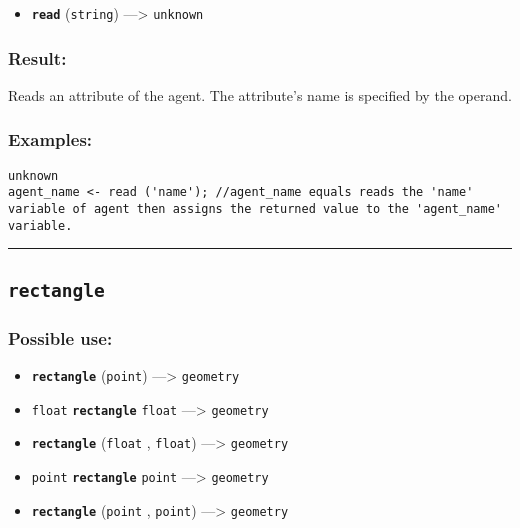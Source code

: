 \documentclass[]{book}
\providecommand{\tightlist}{%
  \setlength{\itemsep}{0pt}\setlength{\parskip}{0pt}}
\theoremstyle{definition}
\theoremstyle{definition}
\theoremstyle{definition}
\theoremstyle{remark}
\begin{document}
\begin{itemize}
\tightlist
\item
  \textbf{\texttt{read}} (\texttt{string}) ---\textgreater{}
  \texttt{unknown}
\end{itemize}

\subsubsection{Result:}\label{result-415}

Reads an attribute of the agent. The attribute's name is specified by
the operand.

\subsubsection{Examples:}\label{examples-294}

\begin{verbatim}
unknown 
agent_name <- read ('name'); //agent_name equals reads the 'name' variable of agent then assigns the returned value to the 'agent_name' variable. 
\end{verbatim}

\begin{center}\rule{0.5\linewidth}{\linethickness}\end{center}

\subsection{\texorpdfstring{\texttt{rectangle}}{rectangle}}\label{rectangle}

\subsubsection{Possible use:}\label{possible-use-430}

\begin{itemize}
\tightlist
\item
  \textbf{\texttt{rectangle}} (\texttt{point}) ---\textgreater{}
  \texttt{geometry}
\item
  \texttt{float} \textbf{\texttt{rectangle}} \texttt{float}
  ---\textgreater{} \texttt{geometry}
\item
  \textbf{\texttt{rectangle}} (\texttt{float} , \texttt{float})
  ---\textgreater{} \texttt{geometry}
\item
  \texttt{point} \textbf{\texttt{rectangle}} \texttt{point}
  ---\textgreater{} \texttt{geometry}
\item
  \textbf{\texttt{rectangle}} (\texttt{point} , \texttt{point})
  ---\textgreater{} \texttt{geometry}
\end{itemize}
\end{document}
